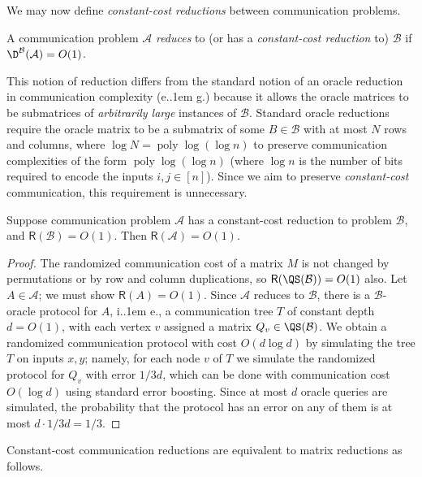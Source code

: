 \documentclass{theoretics}
\makeatletter
\DeclareMathOperator{\poly}{poly}
\newcommand{\cA}{\ensuremath{\mathcal{A}}}
\newcommand{\cB}{\ensuremath{\mathcal{B}}}
\newcommand*\ie{i.\kern.1em e.\@\xspace} %
\newcommand*\eg{e.\kern.1em g.\@\xspace} %
\newcommand{\CC}{\mathsf{R}}
\makeatother
\begin{document}
We may now define \emph{constant-cost reductions} between communication problems.

\begin{definition}
\label{def:constant-cost-reductions}
A communication problem $\cA$ \emph{reduces} to (or has a \emph{constant-cost reduction} to) $\cB$
if $\D^\cB(\cA) = O(1)$.
\end{definition}

\begin{remark}
This notion of reduction differs from the standard notion of an oracle reduction in communication
complexity (\eg \cite{BFS86}) because it allows the oracle matrices to be submatrices of
\emph{arbitrarily large} instances of $\cB$. Standard oracle reductions require the oracle matrix to
be a submatrix of some $B \in \cB$ with at most $N$ rows and columns, where $\log N = \poly\log(\log
n)$ to preserve communication complexities of the form $\poly\log(\log n)$ (where $\log n$ is the
number of bits required to encode the inputs $i,j \in [n]$). Since we aim to preserve
\emph{constant-cost} communication, this requirement is unnecessary.
\end{remark}

\begin{proposition}
Suppose communication problem $\cA$ has a constant-cost reduction to problem $\cB$, and $\CC(\cB) = O(1)$.
Then $\CC(\cA) = O(1)$.
\end{proposition}
\begin{proof}
The randomized communication cost of a matrix $M$ is not changed by permutations or
by row and column duplications, so $\CC(\QS(\cB)) = O(1)$ also. Let $A \in \cA$; we must show $\CC(A) =
O(1)$. Since $\cA$ reduces to $\cB$, there is a
$\cB$-oracle protocol for $A$, \ie,
a communication tree $T$ of constant depth $d = O(1)$, with
each vertex $v$ assigned a matrix $Q_v \in \QS(\cB)$. We obtain a randomized communication protocol
with cost $O(d \log d)$ by simulating the tree $T$ on inputs $x,y$; namely, for each node $v$ of $T$ we simulate
the randomized protocol for $Q_v$ with error $1/3d$, which can be done with communication cost
$O(\log d)$ using standard error boosting. Since at most $d$ oracle queries are simulated,
the probability that the protocol has an error on any of them is at most $d \cdot 1/3d = 1/3$.
\end{proof}

Constant-cost communication reductions are equivalent to matrix reductions as follows.
\end{document}

